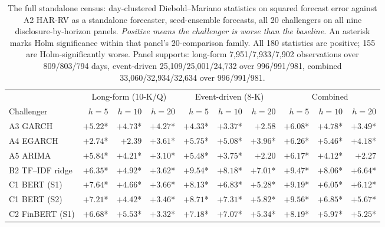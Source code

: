 \begin{table}[p]
\centering
\caption[The 180-comparison standalone census]{The full standalone
census: day-clustered Diebold--Mariano statistics on squared forecast
error against A2 HAR-RV as a standalone forecaster, seed-ensemble
forecasts, all 20 challengers on all nine disclosure-by-horizon panels.
\emph{Positive means the challenger is worse than the baseline.} An
asterisk marks Holm significance within that panel's 20-comparison
family. All 180 statistics are positive; 155 are Holm-significantly
worse. Panel supports: long-form 7{,}951/7{,}933/7{,}902 observations
over 809/803/794 days, event-driven 25{,}109/25{,}001/24{,}732 over
996/991/981, combined 33{,}060/32{,}934/32{,}634 over 996/991/981.}
\label{tab:app-dm180}
\singlespacing\footnotesize
\setlength{\tabcolsep}{3.5pt}
\begin{tabular}{@{}lrrrrrrrrr@{}}
\toprule
& \multicolumn{3}{c}{Long-form (10-K/Q)} & \multicolumn{3}{c}{Event-driven (8-K)} & \multicolumn{3}{c}{Combined} \\
\cmidrule(lr){2-4}\cmidrule(lr){5-7}\cmidrule(lr){8-10}
Challenger & $h{=}5$ & $h{=}10$ & $h{=}20$ & $h{=}5$ & $h{=}10$ & $h{=}20$ & $h{=}5$ & $h{=}10$ & $h{=}20$ \\
\midrule
A3 GARCH               & $+5.22$* & $+4.73$* & $+4.27$* & $+4.33$* & $+3.37$* & $+2.58$\phantom{*} & $+6.08$* & $+4.78$* & $+3.49$* \\
A4 EGARCH              & $+2.74$* & $+2.39$\phantom{*} & $+3.61$* & $+5.75$* & $+5.08$* & $+3.96$* & $+6.26$* & $+5.46$* & $+4.18$* \\
A5 ARIMA               & $+5.84$* & $+4.21$* & $+3.10$* & $+5.48$* & $+3.75$* & $+2.20$\phantom{*} & $+6.17$* & $+4.12$* & $+2.27$\phantom{*} \\
\addlinespace
B2 TF--IDF ridge       & $+6.35$* & $+4.92$* & $+3.62$* & $+9.54$* & $+8.18$* & $+7.01$* & $+9.47$* & $+8.06$* & $+6.64$* \\
C1 BERT (S1)           & $+7.64$* & $+4.66$* & $+3.66$* & $+8.13$* & $+6.83$* & $+5.28$* & $+9.19$* & $+6.05$* & $+6.12$* \\
C1 BERT (S2)           & $+7.21$* & $+4.42$* & $+3.46$* & $+8.71$* & $+7.31$* & $+5.82$* & $+9.56$* & $+6.85$* & $+5.67$* \\
C2 FinBERT (S1)        & $+6.68$* & $+5.53$* & $+3.32$* & $+7.18$* & $+7.07$* & $+5.34$* & $+8.19$* & $+5.97$* & $+5.25$* \\

\end{tabular}
\end{table}

